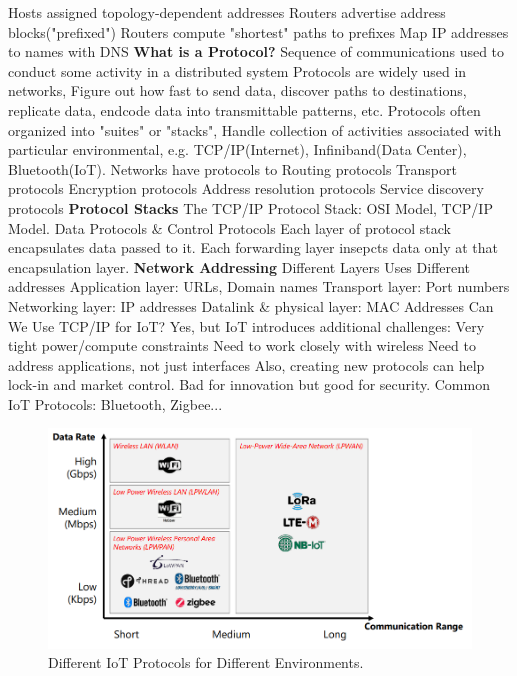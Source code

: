 \documentclass[11 pt]{scrartcl}
\begin{document}
\itemnum
    \ii Hosts assigned topology-dependent addresses
    \ii Routers advertise address blocks("prefixed")
    \ii Routers compute "shortest" paths to prefixes
    \ii Map IP addresses to names with DNS
\itemend
\textbf{What is a Protocol?}
\itemnum
    \ii Sequence of communications used to conduct some activity in a distributed system
    \ii Protocols are widely used in networks, Figure out how fast to send data, discover paths to destinations, replicate data, endcode data into transmittable patterns, etc.
    \ii Protocols often organized into "suites" or "stacks", Handle collection of activities associated with particular environmental, e.g. TCP/IP(Internet), Infiniband(Data Center), Bluetooth(IoT).
\itemend
Networks have protocols to 
\itemnum
    \ii Routing protocols 
    \ii Transport protocols
    \ii Encryption protocols
    \ii Address resolution protocols
    \ii Service discovery protocols
\itemend
\textbf{Protocol Stacks}\newline
The TCP/IP Protocol Stack: OSI Model, TCP/IP Model. Data Protocols \& Control Protocols\newline 
Each layer of protocol stack encapsulates data passed to it. 
Each forwarding layer insepcts data only at that encapsulation layer.\newline
\textbf{Network Addressing}\newline
Different Layers Uses Different addresses
\itemnum
    \ii Application layer: URLs, Domain names
    \ii Transport layer: Port numbers
    \ii Networking layer: IP addresses
    \ii Datalink \& physical layer: MAC Addresses
\itemend
Can We Use TCP/IP for IoT? Yes, but IoT introduces additional challenges:
\itemnum
    \ii Very tight power/compute constraints
    \ii Need to work closely with wireless
    \ii Need to address applications, not just interfaces
\itemend
Also, creating new protocols can help lock-in and market control. Bad for innovation but good for security.\newline
Common IoT Protocols: Bluetooth, Zigbee...
\begin{figure}[!htb]
    \centering
    \includegraphics[scale=0.6]{assets/iot_protocols.png}
    \caption{Different IoT Protocols for Different Environments.}
\end{figure}
\end{document}
